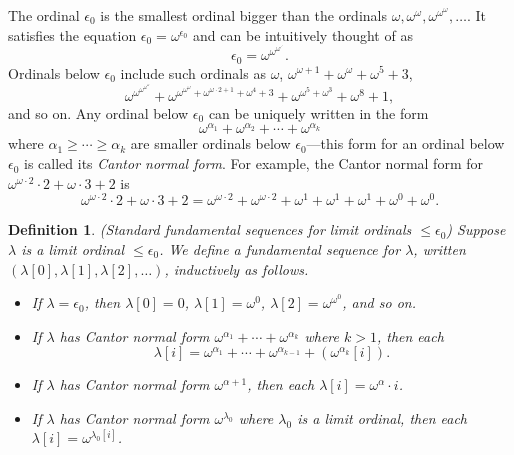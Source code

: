 \documentclass{article}
\newtheorem{definition}[theorem]{Definition}
\begin{document}
The ordinal $\epsilon_0$ is the smallest ordinal bigger than the ordinals
$\omega,\omega^\omega,\omega^{\omega^\omega},\ldots$. It satisfies the equation
$\epsilon_0=\omega^{\epsilon_0}$ and can be intuitively thought of as
\[
    \epsilon_0 = \omega^{\omega^{\omega^{\iddots}}}.
\]
Ordinals below $\epsilon_0$ include such ordinals as $\omega$,
$\omega^{\omega+1}+\omega^{\omega}+\omega^5+3$,
\[
\omega^{\omega^{\omega^{\omega^\omega}}}+
\omega^{\omega^{\omega^\omega}+\omega^{\omega\cdot 2+1}+\omega^4 + 3}
+ \omega^{\omega^5+\omega^3}+\omega^8+1,
\]
and so on.
Any ordinal below $\epsilon_0$ can be uniquely written in the form
\[
    \omega^{\alpha_1}+\omega^{\alpha_2}+\cdots + \omega^{\alpha_k}
\]
where $\alpha_1\geq\cdots\geq\alpha_k$ are smaller ordinals below $\epsilon_0$---this form
for an ordinal below $\epsilon_0$ is called its \emph{Cantor normal form}.
For example, the Cantor normal form for $\omega^{\omega\cdot 2}\cdot 2+\omega\cdot 3+2$
is
\[
\omega^{\omega\cdot 2}\cdot 2+\omega\cdot 3+2
=
\omega^{\omega\cdot 2} + \omega^{\omega\cdot 2} + \omega^1 + \omega^1 + \omega^1
+\omega^0 + \omega^0.
\]

\begin{definition}
\label{fundsequencesdefn}
    (Standard fundamental sequences for limit ordinals $\leq\epsilon_0$)
    Suppose $\lambda$ is a limit ordinal $\leq\epsilon_0$. We define a
    \emph{fundamental sequence for $\lambda$},
    written $(\lambda[0],\lambda[1],\lambda[2],\ldots)$, inductively as follows.
    \begin{itemize}
        \item
        If $\lambda=\epsilon_0$, then $\lambda[0]=0$,
        $\lambda[1]=\omega^0$, $\lambda[2]=\omega^{\omega^0}$, and so on.
        \item
        If $\lambda$ has Cantor normal form
        $\omega^{\alpha_1}+\cdots+\omega^{\alpha_k}$ where $k>1$,
        then
        each
        \[
            \lambda[i] = \omega^{\alpha_1}+\cdots+\omega^{\alpha_{k-1}}
            + (\omega^{\alpha_k}[i]).
        \]
        \item
        If $\lambda$ has Cantor normal form $\omega^{\alpha+1}$,
        then each $\lambda[i]=\omega^{\alpha}\cdot i$.
        \item
        If $\lambda$ has Cantor normal form $\omega^{\lambda_0}$ where $\lambda_0$
        is a limit ordinal, then each $\lambda[i]=\omega^{\lambda_0[i]}$.
    \end{itemize}
\end{definition}
\end{document}
